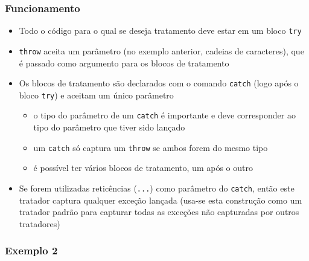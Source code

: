 \documentclass[xcolor={dvipsnames,table},aspectratio=169]{beamer}
\begin{document}
\begin{frame}\frametitle{Funcionamento}
\begin{itemize}
	\item Todo o código para o qual se deseja tratamento deve estar em um bloco \texttt{try}    
	\item \texttt{throw} aceita um parâmetro (no exemplo anterior, cadeias de caracteres), que é passado como argumento para os blocos de tratamento
	\item Os blocos de tratamento são declarados com o comando \texttt{catch} (logo após o bloco \texttt{try}) e aceitam um único parâmetro
	\begin{itemize}
        \item o tipo do parâmetro de um \texttt{catch} é importante e deve corresponder ao tipo do parâmetro que tiver sido lançado
        \item um \texttt{catch} só captura um \texttt{throw} se ambos forem do mesmo tipo
        \item é possível ter vários blocos de tratamento, um após o outro
    \end{itemize}
    \item Se forem utilizadas reticências (\texttt{.{}.{}.}) como parâmetro do \texttt{catch}, então este tratador captura qualquer exceção lançada (usa-se esta construção como um tratador padrão para capturar todas as exceções não capturadas por outros tratadores)
\end{itemize}
\end{frame}

\begin{frame}[fragile]\frametitle{Exemplo 2}

\end{frame}
\end{document}
